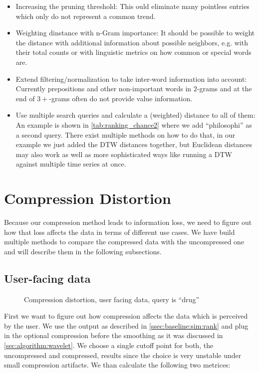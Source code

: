 \begin{itemize}
    \item Increasing the pruning threshold: This ould eliminate many pointless entries which only do not represent a common trend.
    \item Weighting dinstance with n-Gram importance: It should be possible to weight the distance with additional information about possible neighbors, e.g. with their total counts or with linguistic metrics on how common or special words are.
    \item Extend filtering/normalization to take inter-word information into account: Currently prepositions and other non-important words in $2$-grams and at the end of $3+$-grams often do not provide value information.
    \item Use multiple search queries and calculate a (weighted) distance to all of them: An example is shown in \autoref{tab:ranking_chance2} where we add \enquote{philosophi} as a second query. There exist multiple methods on how to do that, in our example we just added the DTW distances together, but Euclidean distances may also work as well as more sophisticated ways like running a DTW against multiple time series at once.
\end{itemize}



\section{Compression Distortion}
\label{sec:evaluation:distortion}

Because our compression method leads to information loss, we need to figure out how that loss affects the data in terms of different use cases. We have build multiple methods to compare the compressed data with the uncompressed one and will describe them in the following subsections.


\subsection{User-facing data}
\label{ssec:evaluation:distortion:user}

\begin{figure}
    \centering
    
    \caption{Compression distortion, user facing data, query is \enquote{drug}}
    \label{fig:compression}
\end{figure}

First we want to figure out how compression affects the data which is perceived by the user. We use the output as described in \autoref{ssec:baseline:sim:rank} and plug in the optional compression before the smoothing as it was discussed in \autoref{sec:algorithm:wavelet}. We choose a single cutoff point for both, the uncompressed and compressed, results since the choice is very unstable under small compression artifacts. We than calculate the following two metrices:

